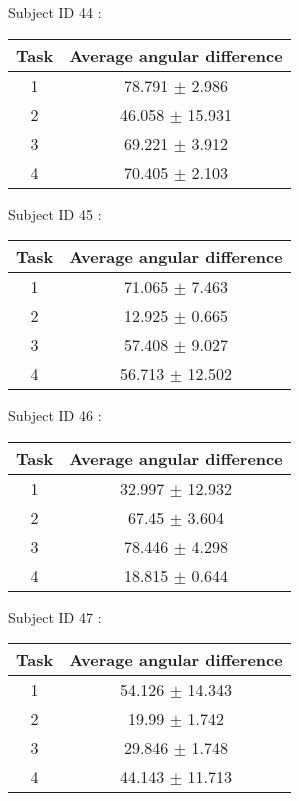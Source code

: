 \documentclass[12pt]{article}
\begin{document}
\par Subject ID  44 :
\begin{center}
\begin{tabular}{|c|c|}
\hline
 Task & Average angular difference \\ \hline
1  &  78.791 $\pm$ 2.986 \\
2  &  46.058 $\pm$ 15.931 \\
3  &  69.221 $\pm$ 3.912 \\
4  &  70.405 $\pm$ 2.103 \\
\hline
\end{tabular}
\end{center}

\par Subject ID  45 :
\begin{center}
\begin{tabular}{|c|c|}
\hline
 Task & Average angular difference \\ \hline
1  &  71.065 $\pm$ 7.463 \\
2  &  12.925 $\pm$ 0.665 \\
3  &  57.408 $\pm$ 9.027 \\
4  &  56.713 $\pm$ 12.502 \\
\hline
\end{tabular}
\end{center}

\par Subject ID  46 :
\begin{center}
\begin{tabular}{|c|c|}
\hline
 Task & Average angular difference \\ \hline
1  &  32.997 $\pm$ 12.932 \\
2  &  67.45 $\pm$ 3.604 \\
3  &  78.446 $\pm$ 4.298 \\
4  &  18.815 $\pm$ 0.644 \\
\hline
\end{tabular}
\end{center}

\par Subject ID  47 :
\begin{center}
\begin{tabular}{|c|c|}
\hline
 Task & Average angular difference \\ \hline
1  &  54.126 $\pm$ 14.343 \\
2  &  19.99 $\pm$ 1.742 \\
3  &  29.846 $\pm$ 1.748 \\
4  &  44.143 $\pm$ 11.713 \\
\hline
\end{tabular}
\end{center}
\end{document}

